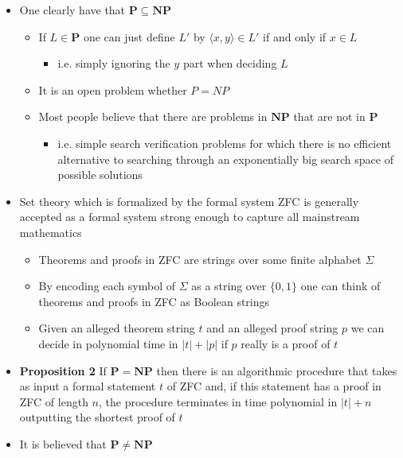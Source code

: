\documentclass[11pt]{article}
\begin{document}
\begin{itemize}
\item One clearly have that \(\mathbf P \subseteq \mathbf{NP}\)
\begin{itemize}
\item If \(L \in \mathbf P\) one can just define \(L'\) by \(\langle x, y \rangle \in L'\) if and only if \(x \in L\) 
\begin{itemize}
\item i.e. simply ignoring the \(y\) part when deciding \(L\)
\end{itemize}
\item It is an open problem whether \(P = NP\)
\item Most people believe that there are problems in \(\mathbf{NP}\) that are not in \(\mathbf P\)
\begin{itemize}
\item i.e. simple search verification problems for which there is no efficient alternative to searching through an exponentially big search space of possible solutions
\end{itemize}
\end{itemize}

\item Set theory which is formalized by the formal system ZFC is generally accepted as a formal system strong enough to capture all mainstream mathematics
\begin{itemize}
\item Theorems and proofs in ZFC are strings over some finite alphabet \(\Sigma\)
\item By encoding each symbol of \(\Sigma\) as a string over \(\{0,1\}\) one can think of theorems and proofs in ZFC as Boolean strings
\item Given an alleged theorem string \(t\) and an alleged proof string \(p\) we can decide in polynomial time in \(|t| + |p|\) if \(p\) really is a proof of \(t\)
\end{itemize}

\item \textbf{Proposition 2} If \(\mathbf P = \mathbf{NP}\) then there is an algorithmic procedure that takes as input a formal statement \(t\) of ZFC and, if this statement has a proof in ZFC of length \(n\), the procedure terminates in time polynomial in \(|t| + n\) outputting the shortest proof of \(t\)

\item It is believed that \(\mathbf P \neq \mathbf{NP}\)
\end{itemize}
\end{document}
